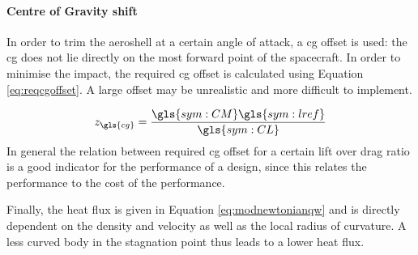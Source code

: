 \paragraph{Centre of Gravity shift}
In order to trim the aeroshell at a certain angle of attack, a \gls{cg} offset is used: the \gls{cg} does not lie directly on the most forward point of the spacecraft. In order to minimise the impact, the required \gls{cg} offset is calculated using Equation \ref{eq:reqcgoffset}. A large offset may be unrealistic and more difficult to implement.

\begin{equation} \label{eq:reqcgoffset}
z_{\gls{cg}} = \frac{\gls{sym:CM}\gls{sym:lref}}{\gls{sym:CL}}
\end{equation}
In general the relation between required \gls{cg} offset for a certain lift over drag ratio is a good indicator for the performance of a design, since this relates the performance to the cost of the performance.

Finally, the heat flux is given in Equation \ref{eq:modnewtonianqw} and is directly dependent on the density and velocity as well as the local radius of curvature. A less curved body in the stagnation point thus leads to a lower heat flux.

